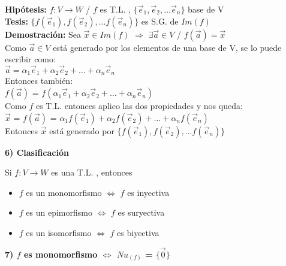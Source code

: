 \documentclass[11pt]{article}
\begin{document}
\vspace{2mm} \noindent
{\bfseries Hipótesis:} $f: V \rightarrow W$ / $f$ es T.L. , $\{\vec{e}_1, \vec{e}_2, \hdots  \vec{e}_n\}$ base de V \\
{\bfseries Tesis:} $\{f(\vec{e}_1), f(\vec{e}_2), \hdots  f(\vec{e}_n)\}$ es S.G. de $Im(f)$ \\
{\bfseries Demostración:} Sea $\vec{x} \in Im(f)$ $\Rightarrow$ $\exists \vec{a} \in V$ / $f(\vec{a}) = \vec{x}$ \\
Como $\vec{a} \in V$ está generado por los elementos de una base de V, se lo puede escribir como: \\
$\vec{a} = \alpha_1\vec{e}_1 + \alpha_2\vec{e}_2 + \hdots + \alpha_n\vec{e}_n$
\\Entonces también: \\
$f(\vec{a})$ = $f(\alpha_1\vec{e}_1 + \alpha_2\vec{e}_2 + \hdots + \alpha_n\vec{e}_n)$\\
Como $f$ es T.L. entonces aplico las dos propiedades y nos queda: \\
$\vec{x}$ = $f(\vec{a})$ = $\alpha_1f(\vec{e}_1) + \alpha_2f(\vec{e}_2) + \hdots + \alpha_nf(\vec{e}_n)$ \\
Entonces $\vec{x}$ está generado por $\{f(\vec{e}_1), f(\vec{e}_2), \hdots  f(\vec{e}_n)\}$

\vspace{2mm} \noindent
{\Large \bfseries{6) Clasificación}}

\vspace{2mm} \noindent
Si $f:V \rightarrow W$ es una T.L. , entonces
\begin{itemize}
\item $f$ es un monomorfismo $\Leftrightarrow$ $f$ es inyectiva
\item $f$ es un epimorfismo $\Leftrightarrow$ $f$ es suryectiva
\item $f$ es un isomorfismo $\Leftrightarrow$ $f$ es biyectiva
\end{itemize}

\vspace{2mm} \noindent
{\Large \bfseries{7) $f$ es monomorfismo $\Leftrightarrow$ $Nu_(f)$ = $\{\vec{0}\}$}}
\end{document}

